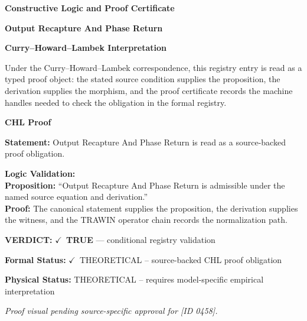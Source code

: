 \clearpage
\begingroup\tzpsupportsetup
\noindent\textbf{\fontsize{10.8pt}{12.8pt}\selectfont [ID 0458] Constructive Logic and Proof Certificate}\par
\noindent\textbf{\fontsize{10pt}{12pt}\selectfont Output Recapture And Phase Return}\par
\vspace{0.45em}
\begingroup
\footnotesize
\setlength{\parskip}{0.22em}
\setlength{\parindent}{0pt}
\noindent\textbf{Curry--Howard--Lambek Interpretation}\par
Under the Curry--Howard--Lambek correspondence, this registry entry is read as a typed proof
object: the stated source condition supplies the proposition, the derivation supplies the
morphism, and the proof certificate records the machine handles needed to check the obligation
in the formal registry.

\vspace{0.45em}
\noindent\textbf{CHL Proof}\par
\textbf{Statement:} Output Recapture And Phase Return is read as a source-backed proof obligation.

\textbf{Logic Validation:}\\
\textbf{Proposition:} ``Output Recapture And Phase Return is admissible under the named source equation and derivation.''\\
\textbf{Proof:} The canonical statement supplies the proposition, the derivation supplies the witness, and the TRAWIN operator chain records the normalization path.

\textbf{VERDICT:} \ensuremath{\checkmark}\ \textbf{TRUE} --- conditional registry validation

\textbf{Formal Status:} \ensuremath{\checkmark}\ THEORETICAL -- source-backed CHL proof obligation

\textbf{Physical Status:} THEORETICAL -- requires model-specific empirical interpretation
\par\vspace{0.45em}
\par
\vfill
\begingroup\footnotesize\itshape
Proof visual pending source-specific approval for [ID 0458].
\par\endgroup
\vfill
\endgroup
\endgroup
